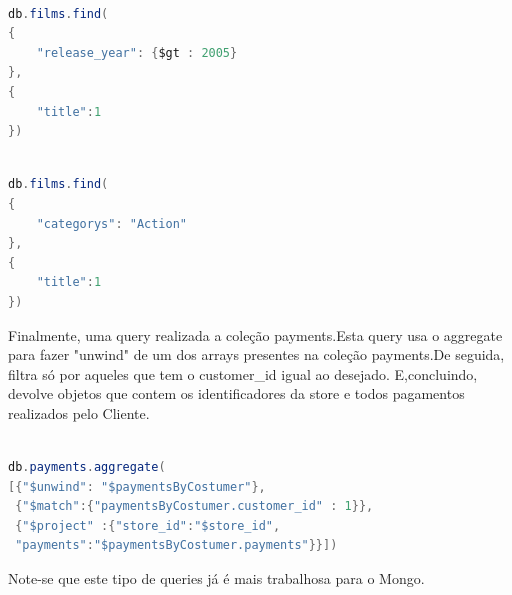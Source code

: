 \begin{lstlisting}[language=java,caption=Query ao Mongo para devolver todos os Filmes estreados depois de 2005]

db.films.find(
{
	"release_year": {$gt : 2005}
},
{
	"title":1
})

\end{lstlisting}

\begin{lstlisting}[language=java,caption=Query ao Mongo para devolver todos os Filmes da Categoria Action]

db.films.find(
{
	"categorys": "Action"
},
{
	"title":1
})
\end{lstlisting}

Finalmente, uma query realizada a coleção payments.Esta query usa o aggregate para fazer "unwind" de um dos arrays presentes na coleção payments.De seguida, filtra só por aqueles que tem o customer\_id igual ao desejado. E,concluindo, devolve objetos que contem os identificadores da store e todos pagamentos realizados pelo Cliente.

\begin{lstlisting}[language=java,caption=Query para obter as faturas de um dado Cliente organizado por Store]

db.payments.aggregate(
[{"$unwind": "$paymentsByCostumer"},
 {"$match":{"paymentsByCostumer.customer_id" : 1}},
 {"$project" :{"store_id":"$store_id",
 "payments":"$paymentsByCostumer.payments"}}])

\end{lstlisting}

Note-se que este tipo de queries já é mais trabalhosa para o Mongo.
